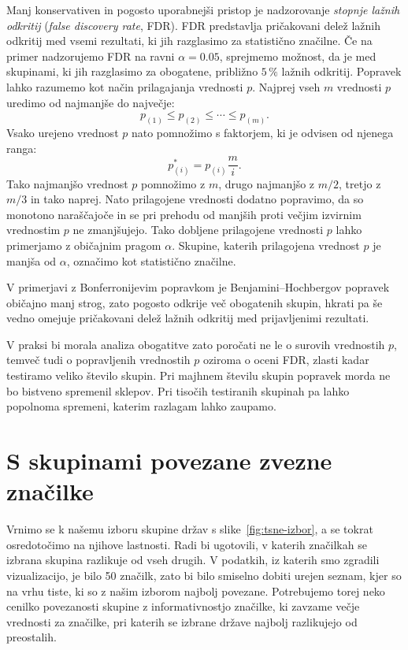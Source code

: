 Manj konservativen in pogosto uporabnejši pristop je nadzorovanje {\em stopnje lažnih odkritij} ({\em false discovery rate}, FDR).
%
%
FDR predstavlja pričakovani delež lažnih odkritij med vsemi rezultati, ki jih razglasimo za statistično značilne. Če na primer nadzorujemo FDR na ravni $\alpha = 0.05$, sprejmemo možnost, da je med skupinami, ki jih razglasimo za obogatene, približno $5\,\%$ lažnih odkritij. Popravek lahko razumemo kot način prilagajanja vrednosti $p$. Najprej vseh $m$ vrednosti $p$ uredimo od najmanjše do največje:
\[
p_{(1)} \le p_{(2)} \le \cdots \le p_{(m)}.
\]
Vsako urejeno vrednost $p$ nato pomnožimo s faktorjem, ki je odvisen od
njenega ranga:
\[
p_{(i)}^\ast = p_{(i)}\frac{m}{i}.
\]
Tako najmanjšo vrednost $p$ pomnožimo z $m$, drugo najmanjšo z $m/2$, tretjo z $m/3$ in tako naprej. Nato prilagojene vrednosti dodatno popravimo, da so monotono naraščajoče in se pri prehodu od manjših proti večjim izvirnim vrednostim $p$ ne zmanjšujejo. Tako dobljene prilagojene vrednosti $p$ lahko primerjamo z običajnim pragom $\alpha$. Skupine, katerih prilagojena vrednost $p$ je manjša od $\alpha$, označimo kot statistično značilne.

V primerjavi z Bonferronijevim popravkom je Benjamini--Hochbergov popravek običajno manj strog, zato pogosto odkrije več obogatenih skupin, hkrati pa še vedno omejuje pričakovani delež lažnih odkritij med prijavljenimi rezultati.

V praksi bi morala analiza obogatitve zato poročati ne le o surovih vrednostih $p$, temveč tudi o popravljenih vrednostih $p$ oziroma o oceni FDR, zlasti kadar testiramo veliko število skupin. Pri majhnem številu skupin popravek morda ne bo bistveno spremenil sklepov. Pri tisočih testiranih skupinah pa lahko popolnoma spremeni, katerim razlagam lahko zaupamo.

\section{S skupinami povezane zvezne značilke}

Vrnimo se k našemu izboru skupine držav s slike~\ref{fig:tsne-izbor}, a se tokrat osredotočimo na njihove lastnosti. Radi bi ugotovili, v katerih značilkah se izbrana skupina razlikuje od vseh drugih. V podatkih, iz katerih smo zgradili vizualizacijo, je bilo 50 značilk, zato bi bilo smiselno dobiti urejen seznam, kjer so na vrhu tiste, ki so z našim izborom najbolj povezane. Potrebujemo torej neko cenilko povezanosti skupine z informativnostjo značilke, ki zavzame večje vrednosti za značilke, pri katerih se izbrane države najbolj razlikujejo od preostalih.

